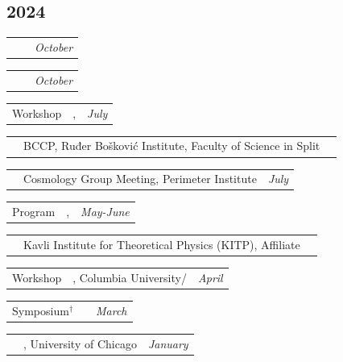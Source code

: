 \documentclass[10pt,a4paper, roman]{moderncv}
\makeatletter
\renewcommand*{\cvitemwithcomment}[3]{%
\parbox{\textwidth}{%
\begin{tabularx}{\textwidth}{@{} p{1.0in} X r @{}} #1 & #2 & \textit{#3} \end{tabularx}%
}%
}
\newcommand{\chref}[3][mutedblue]{\href{#2}{\color{#1}{#3}}}
\newcommand{\chrefccs}[2]{\chref[mutedred]{https://cyril-creque.github.io/files/#1}{#2}}
\makeatother
\begin{document}
\subsection{2024}
\cvitemwithcomment{\chrefccs{talks/Cosmic_Magnetic_Shear_of_Blazars-Tufts.pdf}{Seminar*}}{\chref{https://cosmos.phy.tufts.edu/joint-seminar/Fall-2024/poster-7.pdf}{Joint Tufts/MIT Cosmology Seminar}}{October}
\cvitemwithcomment{\chrefccs{talks/Cosmic_Magnetic_Shear_of_Blazars-Tufts.pdf}{Seminar*}}{\chref{https://events.brown.edu/event/299709-the-brown-theoretical-physics-center-special}{The Brown Theoretical Physics Center Special Seminar}}{October}
\cvitemwithcomment{Workshop}{\chref[mutedblue]{https://bccp-berkeley-2024-split.netlify.app/}{Cosmology in the Adriatic -- From PT to AI},}{July}
\cvitemwithcomment{}{BCCP, Ruđer Bošković Institute, Faculty of Science in Split}{}
\cvitemwithcomment{\chrefccs{talks/Cosmic_Magnetic_Shear_of_Blazars-PI.pdf}{Seminar*}}{Cosmology Group Meeting, Perimeter Institute}{July}
\cvitemwithcomment{Program}{\chref[mutedblue]{https://www.kitp.ucsb.edu/activities/darkmatter24}{Dark Matter Theory, Simulation, \& Analysis in the Era of Large Surveys}, }{May-June}
\cvitemwithcomment{}{Kavli Institute for Theoretical Physics (KITP), Affiliate}{}
\cvitemwithcomment{Workshop}{\chref[mutedblue]{https://www.physics.columbia.edu/events/cancelledthe-future-dark-matter-topical-sessions-opportunities-and-challenges}{The Future of Dark Matter}, Columbia University/\chref[mutedblue]{https://gianfrancobertone.net/2024/04/30/future-of-dark-matter-brainstorming-workshop-at-cca/}{Flatiron Institute}}{April}
\cvitemwithcomment{Symposium$^\dagger$}{\chref[mutedblue]{https://science.nrao.edu/science/meetings/2024/2024-future-of-science-symposium}{Caribbean Future of Science Symposium}}{March}
\cvitemwithcomment{\chrefccs{talks/Cosmic_Magnetic_Shear_of_Blazars-KICP.pdf}{Seminar*}}{\chref[mutedblue]{https://astrophysics.uchicago.edu/events/event/2200/?past=y}{KICP Seminar}, University of Chicago}{January}
\end{document}
